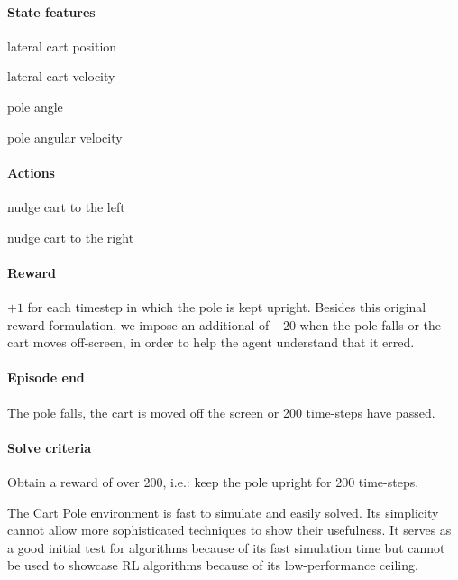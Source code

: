 \documentclass{article}
\begin{document}
\begin{multicols}{2}
\paragraph{State features}
\begin{compactitem}
  \item lateral cart position
  \item lateral cart velocity
  \item pole angle
  \item pole angular velocity
\end{compactitem}

\columnbreak

\paragraph{Actions}
\begin{compactitem}
  \item nudge cart to the left
  \item nudge cart to the right
\end{compactitem}
\end{multicols}

\paragraph{Reward} $+1$ for each timestep in which the pole is kept upright. Besides this original reward formulation, we impose an additional of $-20$ when the pole falls or the cart moves off-screen, in order to help the agent understand that it erred.

\paragraph{Episode end}  The pole falls, the cart is moved off the screen or 200 time-steps have passed.

\paragraph{Solve criteria} Obtain a reward of over 200, i.e.: keep the pole upright for 200 time-steps.

The Cart Pole environment is fast to simulate and easily solved. Its simplicity cannot allow more sophisticated techniques to show their usefulness. It serves as a good initial test for algorithms because of its fast simulation time but cannot be used to showcase RL algorithms because of its low-performance ceiling.
\end{document}
